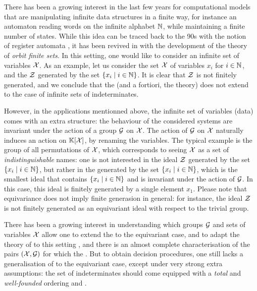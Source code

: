 \AP There has been a growing interest in the last few years for computational
models that are manipulating infinite data structures in a finite way, for
instance an automaton reading words on the infinite alphabet $\mathbb{N}$, while
maintaining a finite number of states. While this idea can be traced back to
the 90s with the notion of register automata \cite{KAFR94}, it has been revived
in with the development of the theory of \emph{orbit finite sets}. In this
setting, one would like to consider an infinite set of variables $\mathcal{X}$. As an
example, let us consider the set $\mathcal{X}$ of variables $x_i$ for $i \in \mathbb{N}$, and
the  $\mathcal{Z}$ generated by the set $\{ x_i \mid i \in \mathbb{N} \}$. It is
clear that $\mathcal{Z}$ is not finitely generated, and we conclude that the
 (and a fortiori, the 
theory) does not extend to the case of infinite sets of indeterminates.

\AP However, in the applications mentionned above, the infinite set of
variables (data) comes with an extra structure: the behaviour of the considered
systems are invariant under the action of a group $\mathcal{G}$ on $\mathcal{X}$. The action
of $\mathcal{G}$ on $\mathcal{X}$ naturally induces an action on $\mathbb{K}[\mathcal{X}]$, by renaming
the variables. The typical example is the group of all permutations of $\mathcal{X}$,
which corresponds to seeing $\mathcal{X}$ as a set of \emph{indistinguishable} names:
one is not interested in the ideal $\mathcal{Z}$ generated by the set $\{ x_i \mid i
\in \mathbb{N} \}$, but rather in the  generated by the set
$\{ x_i \mid i \in \mathbb{N} \}$, which is the smallest ideal that contains
$\{ x_i \mid i \in \mathbb{N} \}$ and is invariant under the action of $\mathcal{G}$. In this
case, this ideal is finitely generated by a single element $x_1$. Please note
that equivariance does not imply finite generasion in general: for instance,
the ideal $\mathcal{Z}$ is not finitely generated as an equivariant ideal with
respect to the trivial group.

\AP There has been a growing interest in understanding which groups $\mathcal{G}$
and sets of variables $\mathcal{X}$ allow one to extend the 
to the equivariant case, and to adapt the theory of  to
this setting \cite{BRDR11,HISU12,HIKRLE18,GHOLAS24}, and there is an almost
complete characterisation of the pairs $(\mathcal{X},\mathcal{G})$ for which the
 \cite[Theorems 11 and 12]{GHOLAS24}.
But to obtain decision procedures, one still lacks a generalisation of
 to the equivariant case, except under very strong
extra assumptions: the set of indeterminates should come equipped with a
\emph{total} and \emph{well-founded} ordering \cite{HIKRLE18} and \cite[Section
6]{GHOLAS24}.

